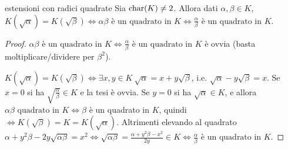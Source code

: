 \begin{theorem}{estensioni con radici quadrate}
    Sia $\text{char}(K) \neq 2$. Allora dati $\alpha, \beta \in K$, $K(\sqrt{\alpha}) = K(\sqrt{\beta}) \iff \alpha\beta \text{ è un quadrato in } K \iff \frac{\alpha}{\beta} \text{ è un quadrato in } K$.
\end{theorem}
\begin{proof}
    $\alpha\beta \text{ è un quadrato in } K \iff \frac{\alpha}{\beta} \text{ è un quadrato in } K$ è ovvia (basta moltiplicare/dividere per $\beta^2$).
    
    $K(\sqrt{\alpha}) = K(\sqrt{\beta}) \iff \exists x,y \in K \ \sqrt{\alpha} = x+y \sqrt{\beta}$, i.e. $\sqrt{\alpha} - y \sqrt{\beta} = x$. Se $x=0$ si ha $\sqrt{\frac{\alpha}{\beta}} \in K$ e la tesi è ovvia. Se $y=0$ si ha $\sqrt{\alpha} \in K$, e allora $\alpha\beta \text{ quadrato in } K \iff  \beta$ è un quadrato in $K$, quindi $\iff K(\sqrt\beta) = K = K(\sqrt\alpha)$. Altrimenti elevando al quadrato
    $\alpha + y^2 \beta - 2y\sqrt{\alpha \beta} = x^2 \iff \sqrt{\alpha\beta} = \frac{\alpha + y^2\beta - x^2}{2y} \in K \iff \frac{\alpha}{\beta} \text{ è un quadrato in } K$. 
\end{proof}

